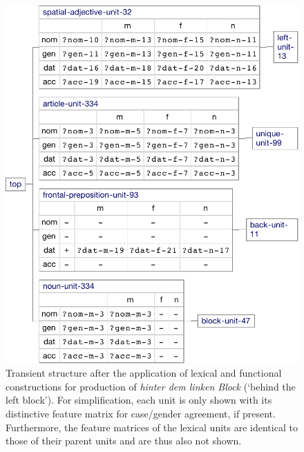\begin{figure}[t]
  \centerline{\includegraphics[scale=0.61]{figs/hinter-dem-linken-block-1}}
  \caption[Transient structure after the application of lexical and
    functional constructions]{Transient structure after the application of lexical and
    functional constructions for production of \textit{hinter dem linken
    Block} (`behind the left block'). For simplification, each unit
    is only shown with its distinctive feature matrix for case/gender
    agreement, if present. Furthermore, the feature matrices of the
    lexical units are identical to those of their parent units and are
    thus also not shown.}
  \label{f:hinter-dem-linken-block-1}
\end{figure}

